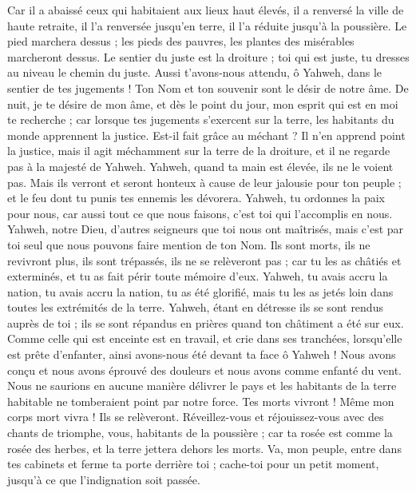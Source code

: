 \begin{multicols}{2}
Car il a abaissé ceux qui habitaient aux lieux haut élevés, il a renversé la ville de haute retraite, il l'a renversée jusqu'en terre, il l'a réduite jusqu'à la poussière.
Le pied marchera dessus ; les pieds des pauvres, les plantes des misérables marcheront dessus.
Le sentier du juste est la droiture ; toi qui est juste, tu dresses au niveau le chemin du juste.
Aussi t'avons-nous attendu, ô Yahweh, dans le sentier de tes jugements ! Ton Nom et ton souvenir sont le désir de notre âme.
De nuit, je te désire de mon âme, et dès le point du jour, mon esprit qui est en moi te recherche ; car lorsque tes jugements s'exercent sur la terre, les habitants du monde apprennent la justice.
Est-il fait grâce au méchant ? Il n'en apprend point la justice, mais il agit méchamment sur la terre de la droiture, et il ne regarde pas à la majesté de Yahweh.
Yahweh, quand ta main est élevée, ils ne le voient pas. Mais ils verront et seront honteux à cause de leur jalousie pour ton peuple ; et le feu dont tu punis tes ennemis les dévorera.
Yahweh, tu ordonnes la paix pour nous, car aussi tout ce que nous faisons, c'est toi qui l'accomplis en nous.
Yahweh, notre Dieu, d'autres seigneurs que toi nous ont maîtrisés, mais c'est par toi seul que nous pouvons faire mention de ton Nom.
Ils sont morts, ils ne revivront plus, ils sont trépassés, ils ne se relèveront pas ; car tu les as châtiés et exterminés, et tu as fait périr toute mémoire d'eux.
Yahweh, tu avais accru la nation, tu avais accru la nation, tu as été glorifié, mais tu les as jetés loin dans toutes les extrémités de la terre.
Yahweh, étant en détresse ils se sont rendus auprès de toi ; ils se sont répandus en prières quand ton châtiment a été sur eux.
Comme celle qui est enceinte est en travail, et crie dans ses tranchées, lorsqu'elle est prête d'enfanter, ainsi avons-nous été devant ta face ô Yahweh !
Nous avons conçu et nous avons éprouvé des douleurs et nous avons comme enfanté du vent. Nous ne saurions en aucune manière délivrer le pays et les habitants de la terre habitable ne tomberaient point par notre force.
Tes morts vivront ! Même mon corps mort vivra ! Ils se relèveront. Réveillez-vous et réjouissez-vous avec des chants de triomphe, vous, habitants de la poussière ; car ta rosée est comme la rosée des herbes, et la terre jettera dehors les morts.
Va, mon peuple, entre dans tes cabinets et ferme ta porte derrière toi ; cache-toi pour un petit moment, jusqu'à ce que l'indignation soit passée.

\end{multicols}

